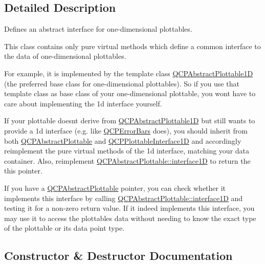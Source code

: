 \subsection{Detailed Description}
Defines an abstract interface for one-\/dimensional plottables. 

This class contains only pure virtual methods which define a common interface to the data of one-\/dimensional plottables.

For example, it is implemented by the template class \mbox{\hyperlink{class_q_c_p_abstract_plottable1_d}{Q\+C\+P\+Abstract\+Plottable1D}} (the preferred base class for one-\/dimensional plottables). So if you use that template class as base class of your one-\/dimensional plottable, you won\textquotesingle{}t have to care about implementing the 1d interface yourself.

If your plottable doesn\textquotesingle{}t derive from \mbox{\hyperlink{class_q_c_p_abstract_plottable1_d}{Q\+C\+P\+Abstract\+Plottable1D}} but still wants to provide a 1d interface (e.\+g. like \mbox{\hyperlink{class_q_c_p_error_bars}{Q\+C\+P\+Error\+Bars}} does), you should inherit from both \mbox{\hyperlink{class_q_c_p_abstract_plottable}{Q\+C\+P\+Abstract\+Plottable}} and \mbox{\hyperlink{class_q_c_p_plottable_interface1_d}{Q\+C\+P\+Plottable\+Interface1D}} and accordingly reimplement the pure virtual methods of the 1d interface, matching your data container. Also, reimplement \mbox{\hyperlink{class_q_c_p_abstract_plottable_a81fd9fd5c4f429c074785e2eb238a8e7}{Q\+C\+P\+Abstract\+Plottable\+::interface1D}} to return the {\ttfamily this} pointer.

If you have a \mbox{\hyperlink{class_q_c_p_abstract_plottable}{Q\+C\+P\+Abstract\+Plottable}} pointer, you can check whether it implements this interface by calling \mbox{\hyperlink{class_q_c_p_abstract_plottable_a81fd9fd5c4f429c074785e2eb238a8e7}{Q\+C\+P\+Abstract\+Plottable\+::interface1D}} and testing it for a non-\/zero return value. If it indeed implements this interface, you may use it to access the plottable\textquotesingle{}s data without needing to know the exact type of the plottable or its data point type. 

\subsection{Constructor \& Destructor Documentation}
\mbox{\label{class_q_c_p_plottable_interface1_d_a8829011d62208625f741f2d7e1cb6280}} 
